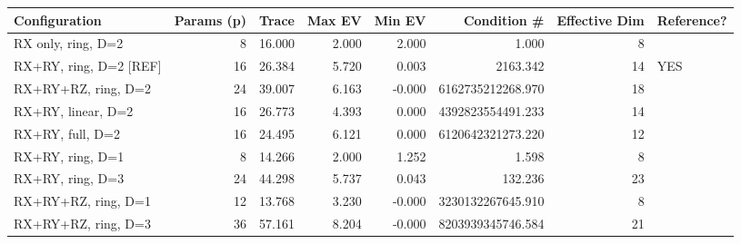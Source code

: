 \begin{tabular}{lrrrrrrl}
\toprule
Configuration & Params (p) & Trace & Max EV & Min EV & Condition # & Effective Dim & Reference? \\
\midrule
RX only, ring, D=2 & 8 & 16.000 & 2.000 & 2.000 & 1.000 & 8 &  \\
RX+RY, ring, D=2  [REF] & 16 & 26.384 & 5.720 & 0.003 & 2163.342 & 14 & YES \\
RX+RY+RZ, ring, D=2 & 24 & 39.007 & 6.163 & -0.000 & 6162735212268.970 & 18 &  \\
RX+RY, linear, D=2 & 16 & 26.773 & 4.393 & 0.000 & 4392823554491.233 & 14 &  \\
RX+RY, full, D=2 & 16 & 24.495 & 6.121 & 0.000 & 6120642321273.220 & 12 &  \\
RX+RY, ring, D=1 & 8 & 14.266 & 2.000 & 1.252 & 1.598 & 8 &  \\
RX+RY, ring, D=3 & 24 & 44.298 & 5.737 & 0.043 & 132.236 & 23 &  \\
RX+RY+RZ, ring, D=1 & 12 & 13.768 & 3.230 & -0.000 & 3230132267645.910 & 8 &  \\
RX+RY+RZ, ring, D=3 & 36 & 57.161 & 8.204 & -0.000 & 8203939345746.584 & 21 &  \\
\bottomrule
\end{tabular}
